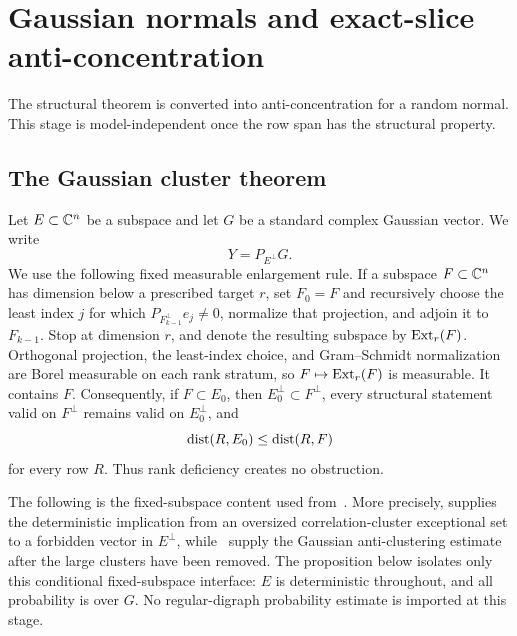 \section{Gaussian normals and exact-slice anti-concentration}\label{sec:normals}

The structural theorem is converted into anti-concentration for a random normal. This stage is model-independent once the row span has the structural property.

\subsection{The Gaussian cluster theorem}

Let $E\subset\mathbb C^n$ be a subspace and let $G$ be a standard complex Gaussian vector. We write
\[
  Y=P_{E^\perp}G.
\]
We use the following fixed measurable enlargement rule. If a subspace $F\subset\mathbb C^n$ has dimension below a prescribed target $r$, set $F_0=F$ and recursively choose the least index $j$ for which $P_{F_{k-1}^\perp}e_j\ne0$, normalize that projection, and adjoin it to $F_{k-1}$. Stop at dimension $r$, and denote the resulting subspace by $\operatorname{Ext}_r(F)$. Orthogonal projection, the least-index choice, and Gram--Schmidt normalization are Borel measurable on each rank stratum, so $F\mapsto\operatorname{Ext}_r(F)$ is measurable. It contains $F$. Consequently, if $F\subset E_0$, then $E_0^\perp\subset F^\perp$, every structural statement valid on $F^\perp$ remains valid on $E_0^\perp$, and
\[
  \operatorname{dist}(R,E_0)\le\operatorname{dist}(R,F)
\]
for every row $R$. Thus rank deficiency creates no obstruction.

The following is the fixed-subspace content used from~\cite[Theorem~4.2 and Lemmas~4.8--4.10]{LLTTY21}. More precisely, 
\cite[Lemma~4.10]{LLTTY21} supplies the deterministic implication from an oversized correlation-cluster exceptional set to a forbidden vector in $E^\perp$, while~\cite[Lemmas~4.8 and 4.9]{LLTTY21} supply the Gaussian anti-clustering estimate after the large clusters have been removed. The proposition below isolates only this conditional fixed-subspace interface: $E$ is deterministic throughout, and all probability is over $G$. No regular-digraph probability estimate is imported at this stage.

